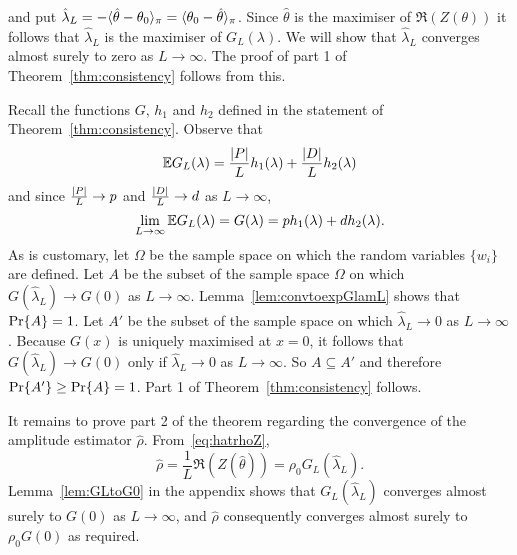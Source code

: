 \documentclass[draftcls, onecolumn, 11pt]{IEEEtran}
\begin{document}
and put $\hat{\lambda}_L = -\langle \hat{\theta} - \theta_0 \rangle_\pi = \langle \theta_0 - \hat{\theta} \rangle_\pi$.  Since $\hat{\theta}$ is the maximiser of $\Re(Z(\theta))$ it follows that $\hat{\lambda}_L$ is the maximiser of $G_L(\lambda)$.  We will show that $\hat{\lambda}_L$ converges almost surely to zero as $L \rightarrow \infty$.  The proof of part 1 of Theorem~\ref{thm:consistency} follows from this.

Recall the functions $G$, $h_1$ and $h_2$ defined in the statement of Theorem~\ref{thm:consistency}.  Observe that
\[
{\mathbb E} G_L(\lambda) = \frac{{\left\vert P \right\vert}}{L} h_1(\lambda) + \frac{{\left\vert D \right\vert}}{L} h_2(\lambda)
\]
and since $\frac{{\left\vert P \right\vert}}{L} \rightarrow p$ and $\frac{{\left\vert D \right\vert}}{L} \rightarrow d$ as $L \rightarrow \infty$,
\[
\lim_{L \rightarrow\infty} {\mathbb E} G_L(\lambda) = G(\lambda) = p h_1(\lambda)   +  d h_2(\lambda).
\]
As is customary, let $\Omega$ be the sample space on which the random variables $\{w_i\}$ are defined.  Let $A$ be the subset of the sample space $\Omega$ on which $G(\hat{\lambda}_L) \rightarrow G(0)$ as $L\rightarrow\infty$.  Lemma~\ref{lem:convtoexpGlamL} shows that ${\operatorname{Pr}}\{A\} = 1$.  Let $A'$ be the subset of the sample space on which $\hat{\lambda}_L \rightarrow 0$ as $L\rightarrow \infty$.  Because $G(x)$ is uniquely maximised at $x=0$, it follows that $G(\hat{\lambda}_L) \rightarrow G(0)$ only if $\hat{\lambda}_L \rightarrow 0$ as $L \rightarrow\infty$. So $A \subseteq A'$ and therefore ${\operatorname{Pr}}\{A'\} \geq {\operatorname{Pr}}\{A\} = 1$.  Part 1 of Theorem~\ref{thm:consistency} follows.  

It remains to prove part 2 of the theorem regarding the convergence of the amplitude estimator $\hat{\rho}$.  From~\eqref{eq:hatrhoZ},
\begin{equation}\label{eq:rhoGLZ}
\hat{\rho} = \frac{1}{L}\Re(Z(\hat{\theta})) = \rho_0 G_L(\hat{\lambda}_L).
\end{equation}  
Lemma~\ref{lem:GLtoG0} in the appendix shows that $G_L(\hat{\lambda}_L)$ converges almost surely to $G(0)$ as $L\rightarrow\infty$, and $\hat{\rho}$ consequently converges almost surely to $\rho_0 G(0)$ as required.  %
\end{document}
